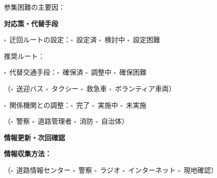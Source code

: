 \documentclass[a4paper,12pt]{jarticle}
\newcommand{\checkbox}{$\square$\ }
\newcommand{\underlinespace}[1]{\underline{\hspace{#1}}}
\begin{document}
\vspace{2mm}

\noindent
参集困難の主要因：\underlinespace{10cm}

\vspace{8mm}

\begin{center}
\textbf{\large 対応策・代替手段}
\end{center}

\vspace{3mm}

\noindent
\checkbox 迂回ルートの設定：\checkbox 設定済 \quad \checkbox 検討中 \quad \checkbox 設定困難

\vspace{2mm}

\noindent
推奨ルート：\underlinespace{10cm}

\vspace{3mm}

\noindent
\checkbox 代替交通手段：\checkbox 確保済 \quad \checkbox 調整中 \quad \checkbox 確保困難

\vspace{2mm}

\noindent
（\checkbox 送迎バス \quad \checkbox タクシー \quad \checkbox 救急車 \quad \checkbox ボランティア車両）

\vspace{3mm}

\noindent
\checkbox 関係機関との調整：\checkbox 完了 \quad \checkbox 実施中 \quad \checkbox 未実施

\vspace{2mm}

\noindent
（\checkbox 警察 \quad \checkbox 道路管理者 \quad \checkbox 消防 \quad \checkbox 自治体）

\vspace{8mm}

\begin{center}
\textbf{\large 情報更新・次回確認}
\end{center}

\vspace{3mm}

\noindent
\textbf{情報収集方法：}

\vspace{2mm}

\noindent
（\checkbox 道路情報センター \quad \checkbox 警察 \quad \checkbox ラジオ \quad \checkbox インターネット \quad \checkbox 現地確認）

\vspace{3mm}
\end{document}
